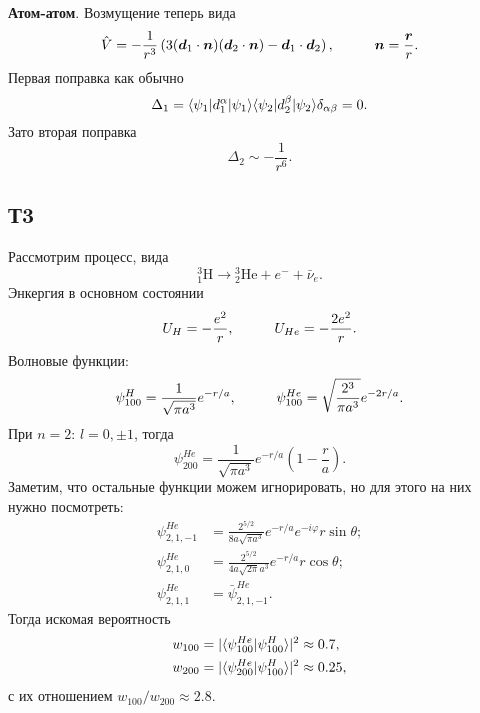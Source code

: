 \textbf{Атом-атом}. Возмущение теперь вида
\begin{equation*}
    \hat{V} = - \frac{1}{r^3} \left(
        3 (\vc{d}_1 \cdot \vc{n}) (\vc{d}_2 \cdot \vc{n}) - \vc{d}_1 \cdot \vc{d}_2
    \right),
    \hspace{10 mm} 
    \vc{n} = \frac{\vc{r}}{r}.
\end{equation*}
Первая поправка как обычно
\begin{equation*}
    \Delta_1 = \bk{\psi_1}[d_1^\alpha]{\psi_1} \bk{\psi_2}[d_2^\beta]{\psi_2} \delta_{\alpha \beta} = 0.
\end{equation*}
Зато вторая поправка
\begin{equation*}
    \Delta_2 \sim - \frac{1}{r^6}.
\end{equation*}




\subsection*{Т3}

Рассмотрим процесс, вида
\begin{equation*}
    {}^3_1 \text{H} \longrightarrow {}_2^3 \text{He} + e^- + \bar{\nu}_e.
\end{equation*}
Энкергия в основном состоянии
\begin{equation*}
    U_H = - \frac{e^2}{r},
    \hspace{10 mm} 
    U_{He} = - \frac{2 e^2}{r}.
\end{equation*}
Волновые функции:
\begin{equation*}
    \psi^H_{100} = \frac{1}{\sqrt{\pi a^3}} e^{-r/a},
    \hspace{10 mm} 
    \psi^{He}_{100} = \sqrt{\frac{2^3}{\pi a^3}} e^{-2r/a}.
\end{equation*}
При $n=2$: $l = 0, \pm 1$, тогда
\begin{equation*}
    \psi^{He}_{200} = \frac{1}{\sqrt{\pi a^3}} e^{- r/a} \left(1 - \frac{r}{a}\right).
\end{equation*}
Заметим, что остальные функции можем игнорировать, но для этого на них нужно посмотреть:
\begin{align*}
    \psi_{2,1,-1}^{He} &= \frac{2^{5/2}}{8 a \sqrt{\pi a^3}} e^{-r/a} e^{- i \varphi} r \sin \theta; \\
    \psi_{2,1,0}^{He} &= \frac{2^{5/2}}{4 a \sqrt{2 \pi} a^3} e^{-r/a} r \cos \theta; \\
    \psi_{2,1,1}^{He} &= \bar{\psi}_{2,1,-1}^{He}.
\end{align*}
Тогда искомая вероятность
\begin{align*}
    w_{100} &= |\bk{\psi^{He}_{100}}{\psi^H_{100}}|^2 \approx 0.7, \\ 
    w_{200} &= |\bk{\psi^{He}_{200}}{\psi^H_{100}}|^2 \approx 0.25,
\end{align*}
с их отношением $w_{100} / w_{200} \approx 2.8$.



